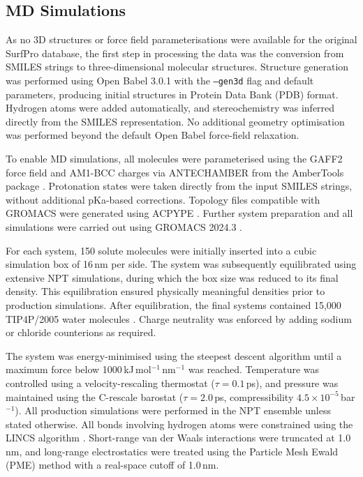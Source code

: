 \documentclass[letterpaper]{article}
\begin{document}
\subsection{MD Simulations}
\label{sec:methods:molecular_dynamics}

As no 3D structures or force field parameterisations were available for the original SurfPro database, the first step in processing the data was the conversion from SMILES strings to three-dimensional molecular structures. Structure generation was performed using Open Babel 3.0.1 \cite{oboyle_open_2011} with the {\tt --gen3d} flag and default parameters, producing initial structures in Protein Data Bank (PDB) format. Hydrogen atoms were added automatically, and stereochemistry was inferred directly from the SMILES representation. No additional geometry optimisation was performed beyond the default Open Babel force-field relaxation.

To enable MD simulations, all molecules were parameterised using the GAFF2 force field \cite{wang_development_2004} and AM1-BCC charges \cite{jakalian_fast_2002} via ANTECHAMBER from the AmberTools package \cite{case_ambertools_2023}. Protonation states were taken directly from the input SMILES strings, without additional pKa-based corrections. Topology files compatible with GROMACS were generated using ACPYPE \cite{sousa_da_silva_acpype_2012}. Further system preparation and all simulations were carried out using GROMACS 2024.3 \cite{lindahl_gromacs_2001,abraham_gromacs_2015}.

For each system, 150 solute molecules were initially inserted into a cubic simulation box of 16\,nm per side. The system was subsequently equilibrated using extensive NPT simulations, during which the box size was reduced to its final density. This equilibration ensured physically meaningful densities prior to production simulations. After equilibration, the final systems contained 15,000 TIP4P/2005 water molecules \cite{abascal_general_2005}. Charge neutrality was enforced by adding sodium or chloride counterions as required.

The system was energy-minimised using the steepest descent algorithm until a maximum force below 1000\,kJ\,mol$^{-1}$\,nm$^{-1}$ was reached. Temperature was controlled using a velocity-rescaling thermostat ($\tau = 0.1$\,ps), and pressure was maintained using the C-rescale barostat ($\tau = 2.0$\,ps, compressibility $4.5 \times 10^{-5}$\,bar$^{-1}$). All production simulations were performed in the NPT ensemble unless stated otherwise. All bonds involving hydrogen atoms were constrained using the LINCS algorithm \cite{hess_lincs_1997}. Short-range van der Waals interactions were truncated at 1.0\,nm, and long-range electrostatics were treated using the Particle Mesh Ewald (PME) method with a real-space cutoff of 1.0\,nm.
\end{document}
